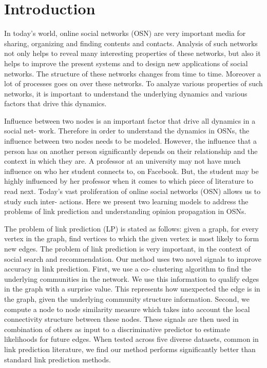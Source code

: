\section*{Introduction}
In today’s world, online social networks (OSN) are very important media for sharing, organizing
and finding contents and contacts. Analysis of such networks not only helps to reveal many
interesting properties of these networks, but also it helps to improve the present systems and to
design new applications of social networks. The structure of these networks changes from time
to time. Moreover a lot of processes goes on over these networks. To analyze various properties
of such networks, it is important to understand the underlying dynamics and various factors
that drive this dynamics.

Influence between two nodes is an important factor that drive all dynamics in a social net-
work. Therefore in order to understand the dynamics in OSNs, the influence between two nodes
needs to be modeled. However, the influence that a person has on another person significantly
depends on their relationship and the context in which they are. A professor at an university
may not have much influence on who her student connects to, on Facebook. But, the student
may be highly influenced by her professor when it comes to which piece of literature to read
next. Today’s vast proliferation of online social networks (OSN) allows us to study such inter-
actions. Here we present two learning models to address the problems of link prediction and
understanding opinion propagation in OSNs.

The problem of link prediction (LP) is stated as follows: given a graph, for every vertex in
the graph, find vertices to which the given vertex is most likely to form new edges. The problem
of link prediction is very important, in the context of social search and recommendation. Our
method uses two novel signals to improve accuracy in link prediction. First, we use a co-
clustering algorithm to find the underlying communities in the network. We use this information
to qualify edges in the graph with a surprise value. This represents how unexpected the edge is in
the graph, given the underlying community structure information. Second, we compute a node
to node similarity measure which takes into account the local connectivity structure between
these nodes. These signals are then used in combination of others as input to a discriminative
predictor to estimate likelihoods for future edges. When tested across five diverse datasets,
common in link prediction literature, we find our method performs significantly better than
standard link prediction methods.

